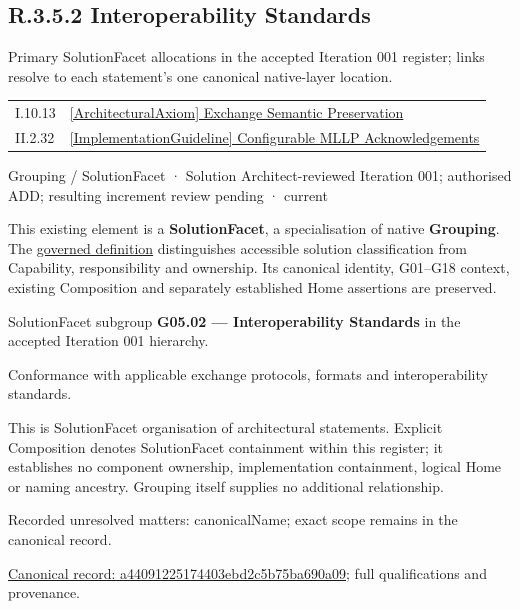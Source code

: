 \subsection*{R.3.5.2 Interoperability Standards}
\label{navigation:R.3.5.2}

Primary SolutionFacet allocations in the accepted Iteration 001 register; links resolve to each statement’s one canonical native-layer location.\par
\begin{longtable}{p{.22\linewidth}p{.73\linewidth}}
I.10.13 & \hyperref[element:602eb50793f448d8bdbc92d41f851877]{[ArchitecturalAxiom] Exchange Semantic Preservation} \\
II.2.32 & \hyperref[element:ab4206c7312449569abaa818b3a8727a]{[ImplementationGuideline] Configurable MLLP Acknowledgements} \\
\end{longtable}
\label{element:a44091225174403ebd2c5b75ba690a09}
{\small Grouping / SolutionFacet · Solution Architect-reviewed Iteration 001; authorised ADD; resulting increment review pending · current}\par

This existing element is a \textbf{SolutionFacet}, a specialisation of native
\textbf{Grouping}. The \href{\detokenize{../../../../../../../governance/continuum-representation.md#solutionfacet-classification--1119-candidate}}{governed definition}
distinguishes accessible solution classification from Capability, responsibility
and ownership. Its canonical identity, G01–G18 context, existing Composition
and separately established Home assertions are preserved.



SolutionFacet subgroup \textbf{G05.02 — Interoperability Standards} in the accepted Iteration 001 hierarchy.



Conformance with applicable exchange protocols, formats and interoperability standards.



This is SolutionFacet organisation of architectural statements. Explicit Composition denotes SolutionFacet containment within this register; it establishes no component ownership, implementation containment, logical Home or naming ancestry. Grouping itself supplies no additional relationship.


{\small Recorded unresolved matters: canonicalName; exact scope remains in the canonical record.}\par
{\footnotesize \href{../../../../../../../continuum/grouping/a44091225174403ebd2c5b75ba690a09.md}{Canonical record: a44091225174403ebd2c5b75ba690a09}; full qualifications and provenance.}\par
